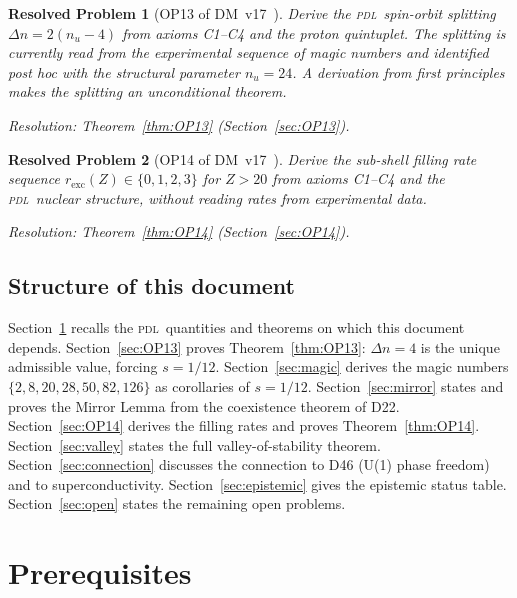 \documentclass[12pt,a4paper]{article}
\newtheorem{resolvedproblem}{Resolved Problem}
\newcommand{\PDL}{\textsc{pdl}}
\newcommand{\nuu}{n_u}
\newcommand{\Dn}{\Delta n}
\newcommand{\rexc}{r_{\mathrm{exc}}}
\begin{document}
\begin{resolvedproblem}[OP13 of DM~v17~\cite{PDL_DM_v17_2026}]
\label{rp:OP13}
Derive the \PDL\ spin-orbit splitting $\Dn = 2(\nuu - 4)$ from axioms C1--C4 and the proton quintuplet. The splitting is currently read from the experimental sequence of magic numbers and identified post hoc with the structural parameter $\nuu = 24$. A derivation from first principles makes the splitting an unconditional theorem.

\emph{Resolution:} Theorem~\ref{thm:OP13} (Section~\ref{sec:OP13}).
\end{resolvedproblem}

\begin{resolvedproblem}[OP14 of DM~v17~\cite{PDL_DM_v17_2026}]
\label{rp:OP14}
Derive the sub-shell filling rate sequence $\rexc(Z) \in \{0,1,2,3\}$ for $Z > 20$ from axioms C1--C4 and the \PDL\ nuclear structure, without reading rates from experimental data.

\emph{Resolution:} Theorem~\ref{thm:OP14} (Section~\ref{sec:OP14}).
\end{resolvedproblem}

\subsection{Structure of this document}

Section~\ref{sec:prereq} recalls the \PDL\ quantities and theorems on which this document depends. Section~\ref{sec:OP13} proves Theorem~\ref{thm:OP13}: $\Dn = 4$ is the unique admissible value, forcing $s = 1/12$. Section~\ref{sec:magic} derives the magic numbers $\{2,8,20,28,50,82,126\}$ as corollaries of $s = 1/12$. Section~\ref{sec:mirror} states and proves the Mirror Lemma from the coexistence theorem of D22. Section~\ref{sec:OP14} derives the filling rates and proves Theorem~\ref{thm:OP14}. Section~\ref{sec:valley} states the full valley-of-stability theorem. Section~\ref{sec:connection} discusses the connection to D46 (U(1) phase freedom) and to superconductivity. Section~\ref{sec:epistemic} gives the epistemic status table. Section~\ref{sec:open} states the remaining open problems.

\section{Prerequisites}
\label{sec:prereq}
\end{document}

